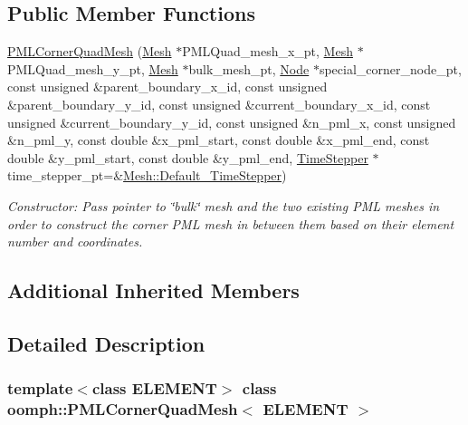 \subsection*{Public Member Functions}
\begin{DoxyCompactItemize}
\item 
\hyperlink{classoomph_1_1PMLCornerQuadMesh_ad3281c5cd6b8283ddab295c3acbaf218}{P\+M\+L\+Corner\+Quad\+Mesh} (\hyperlink{classoomph_1_1Mesh}{Mesh} $\ast$P\+M\+L\+Quad\+\_\+mesh\+\_\+x\+\_\+pt, \hyperlink{classoomph_1_1Mesh}{Mesh} $\ast$P\+M\+L\+Quad\+\_\+mesh\+\_\+y\+\_\+pt, \hyperlink{classoomph_1_1Mesh}{Mesh} $\ast$bulk\+\_\+mesh\+\_\+pt, \hyperlink{classoomph_1_1Node}{Node} $\ast$special\+\_\+corner\+\_\+node\+\_\+pt, const unsigned \&parent\+\_\+boundary\+\_\+x\+\_\+id, const unsigned \&parent\+\_\+boundary\+\_\+y\+\_\+id, const unsigned \&current\+\_\+boundary\+\_\+x\+\_\+id, const unsigned \&current\+\_\+boundary\+\_\+y\+\_\+id, const unsigned \&n\+\_\+pml\+\_\+x, const unsigned \&n\+\_\+pml\+\_\+y, const double \&x\+\_\+pml\+\_\+start, const double \&x\+\_\+pml\+\_\+end, const double \&y\+\_\+pml\+\_\+start, const double \&y\+\_\+pml\+\_\+end, \hyperlink{classoomph_1_1TimeStepper}{Time\+Stepper} $\ast$time\+\_\+stepper\+\_\+pt=\&\hyperlink{classoomph_1_1Mesh_a12243d0fee2b1fcee729ee5a4777ea10}{Mesh\+::\+Default\+\_\+\+Time\+Stepper})
\begin{DoxyCompactList}\small\item\em Constructor\+: Pass pointer to \char`\"{}bulk\char`\"{} mesh and the two existing P\+ML meshes in order to construct the corner P\+ML mesh in between them based on their element number and coordinates. \end{DoxyCompactList}\end{DoxyCompactItemize}
\subsection*{Additional Inherited Members}


\subsection{Detailed Description}
\subsubsection*{template$<$class E\+L\+E\+M\+E\+NT$>$\newline
class oomph\+::\+P\+M\+L\+Corner\+Quad\+Mesh$<$ E\+L\+E\+M\+E\+N\+T $>$}

